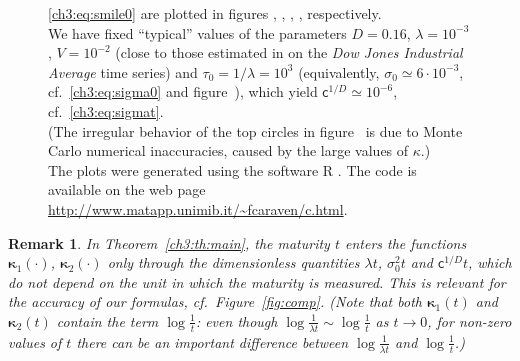 \documentclass[a4paper,reqno,11pt]{amsart}
\numberwithin{equation}{section}
\newtheorem{remark}[theorem]{Remark}
\newcommand\sfc{\mathsf{c}}
\newcommand\bkappa{\boldsymbol{\kappa}}
\begin{document}
\begin{figure}
{\eqref{ch3:eq:smile0} are plotted in 
 figures {\sc{}}, {\sc{}}, {\sc{}}, {\sc{}}, respectively.\\
We have fixed ``typical'' values of the parameters $D = 0.16$,
$\lambda = 10^{-3}$, $V = 10^{-2}$ (close to those estimated
in \cite{cf:ACDP} on the \emph{Dow Jones Industrial Average} time series)
and $\tau_0 = 1/\lambda = 10^3$
(equivalently, $\sigma_0 \simeq 6 \cdot 10^{-3}$,
cf.\ \eqref{ch3:eq:sigma0} and figure~{\sc{}}), which yield
$\sfc^{1/D} \simeq 10^{-6}$, cf.\ \eqref{ch3:eq:sigmat}.\\
(The irregular behavior of the top circles in figure~{\sc{}}
is due to Monte Carlo numerical inaccuracies, caused by the large
values of $\kappa$.) \\
The plots were generated using the software R \cite{R}.
The code is available on the web
page \url{http://www.matapp.unimib.it/~fcaraven/c.html}.}
\label{fig:variability}
\end{figure}


\begin{remark}\rm
In Theorem~\ref{ch3:th:main},
the maturity $t$ enters the functions $\bkappa_1(\cdot)$,
$\bkappa_2(\cdot)$
only through the \emph{dimensionless quantities $\lambda t$,
$\sigma_0^2 t$ and $\sfc^{1/D} t$}, which do not depend on the unit in which the maturity
is measured. This is relevant for the accuracy of our formulas, cf.\ Figure~\ref{fig:comp}.
(Note that both $\bkappa_1(t)$ and $\bkappa_2(t)$ contain the term
$\log \frac{1}{t}$: even though $\log \frac{1}{\lambda t} \sim \log \frac{1}{t}$ as $t \to 0$,
for non-zero values of $t$ there can be an important difference between 
$\log\frac{1}{\lambda t}$ and $\log\frac{1}{t}$.)
\end{remark}
\end{document}
